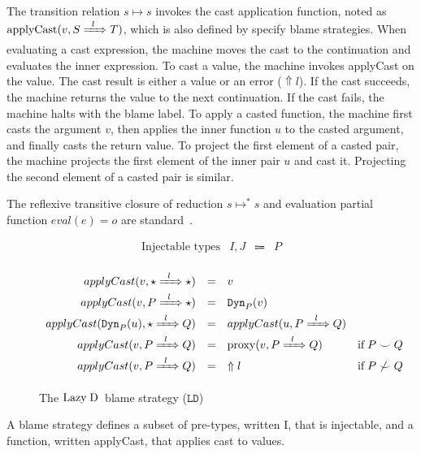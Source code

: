 \documentclass[runningheads]{llncs}
\newcommand{\sidecond}[1]{\text{if}\;#1}
\newcommand{\figequalto}[3]{#1 & = & #2 & #3 \\}
\newcommand{\stxrule}[3]{\text{#2} & #1 & \Coloneqq & #3\\}
\newcommand{\LD}{\ensuremath{\text{Lazy\;D}}}
\newcommand{\just}[1]{\ensuremath{#1}}
\newcommand{\error}[1]{\ensuremath{\Uparrow#1}}
\newcommand{\Tdyn}[0]{\ensuremath{\star}}
\newcommand{\ccast}[3]{#1 \xRightarrow[]{\enskip #2 \enskip} #3}
\newcommand{\vdyn}[2]{\mathtt{Dyn}_{#1}(#2)}
\newcommand{\BLD}[0]{\ensuremath{\mathtt{LD}}}
\newcommand{\proxy}[2]{\ensuremath{\mathrm{proxy}(#1,#2)}}
\newcommand{\applyCast}[2]{\ensuremath{\mathrm{applyCast}(#1,#2)}}
\newcommand{\shallowlyconsistent}[2]{\ensuremath{#1\smile#2}}
\newcommand{\notshallowlyconsistent}[2]{\ensuremath{#1\not\smile#2}}
\newcommand{\transitivelyreduceto}[2]{\ensuremath{#1 \longmapsto^{*} #2}}
\newcommand{\reduceto}[2]{\ensuremath{#1 \longmapsto #2}}
\newcommand{\evalto}[2]{\ensuremath{\mathit{eval}(#1)=#2}}
\begin{document}
The transition relation \reduceto{s}{s} invokes the cast application
function, noted as $\applyCast{v}{\ccast{S}{l}{T}}$, which is also defined
by specify blame strategies.
%
When evaluating a cast expression, the machine moves the cast to the
continuation and evaluates the inner expression.
%
To cast a value, the machine invokes applyCast on the value. The cast
result is either a value or an error (\error{l}). If the cast
succeeds, the machine returns the value to the next continuation.  If
the cast fails, the machine halts with the blame label.
%
To apply a casted function, the machine first casts the argument $v$, then
applies the inner function $u$ to the casted argument, and finally
casts the return value.
%
To project the first element of a casted pair, the machine projects
the first element of the inner pair $u$ and cast it.
%
Projecting the second element of a casted pair is similar.

The reflexive transitive closure of reduction \transitivelyreduceto{s}{s}
and evaluation partial function ${\evalto{e}{o}}$ are standard~\citep{felleisen03:_pllc}.

\begin{figure}
\[
\begin{array}{lrcl}
\stxrule{I,J}{Injectable types}{P}
\end{array}
\]
	
\fbox{$\mathit{applyCast}_{\BLD}(v,\ccast{S}{l}{T}) = r$}
\[
\begin{array}{rclr}
\figequalto{
	applyCast(v,\ccast{\Tdyn}{l}{\Tdyn})
}{
	\just{v}
}{}
\figequalto{
applyCast(v,\ccast{P}{l}{\Tdyn})
}{
	\just{\vdyn{P}{v}}
}{}
\figequalto{
	applyCast(\vdyn{P}{u},\ccast{\Tdyn}{l}{Q})
}{
	applyCast(u,\ccast{P}{l}{Q})
}{}
\figequalto{
	applyCast(v,\ccast{P}{l}{Q})
}{
	\just{\proxy{v}{\ccast{P}{l}{Q}}}
}{\sidecond{\shallowlyconsistent{P}{Q}}}
\figequalto{
	applyCast(v,\ccast{P}{l}{Q})
}{
	\error{l}
}{\sidecond{\notshallowlyconsistent{P}{Q}}}
\end{array}
\]
\caption{The \LD\ blame strategy (\BLD)}
\label{fig:blame-strategy-LazyD}
\end{figure}

\begin{definition}
A blame strategy defines a subset of pre-types, written I, that is injectable,
and a function, written applyCast, that applies cast to values.
\end{definition}
\end{document}
